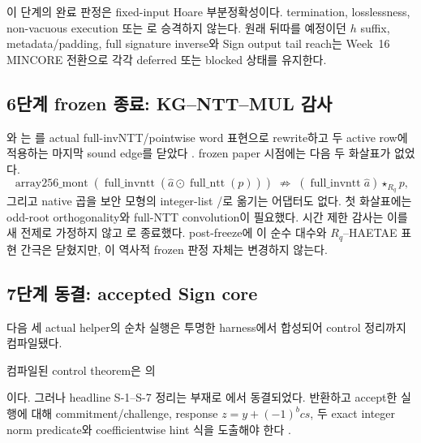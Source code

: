 이 단계의 완료 판정은 fixed-input Hoare 부분정확성이다. termination,
losslessness, non-vacuous execution 또는 로 승격하지 않는다.
원래 뒤따를 예정이던 \(h\) suffix, metadata/padding, full signature inverse와
Sign output tail reach는 Week~16 MINCORE 전환으로 각각 deferred 또는 blocked
상태를 유지한다.

\subsection{6단계 frozen 종료: KG--NTT--MUL 감사}

와
는
를 actual full-invNTT/pointwise
word 표현으로 rewrite하고 두 active row에 적용하는 마지막 sound edge를 닫았다
\cite{week16-kg-ntt-mul-report}. frozen paper 시점에는 다음 두 화살표가 없었다.
\[
  \operatorname{array256\_mont}
    (\operatorname{full\_invntt}(\widehat a\odot\operatorname{full\_ntt}(p)))
  \;\not\Longrightarrow\;
  (\operatorname{full\_invntt}\widehat a)\star_{R_q}p,
\]
그리고 native  곱을 보안 모형의 integer-list
/로 옮기는 어댑터도 없다. 첫
화살표에는 odd-root orthogonality와 full-NTT convolution이 필요했다. 시간 제한
감사는 이를 새 전제로 가정하지 않고 로 종료했다.
post-freeze에 이 순수 대수와 \(R_q\)--HAETAE 표현 간극은 닫혔지만, 이 역사적
frozen 판정 자체는 변경하지 않는다.

\subsection{7단계 동결: accepted Sign core}

다음 세 actual helper의 순차 실행은 투명한 harness에서 합성되어 control
정리까지 컴파일됐다.
\begin{center}
\quad
{}\quad
{}
\end{center}
컴파일된 control theorem은
의
\begin{center}
\end{center}
이다. 그러나 headline S-1--S-7 정리는
 부재로
에서 동결되었다.
반환하고 accept한 실행에 대해 commitment/challenge, response
\(z=y+(-1)^bcs\), 두 exact integer norm predicate와 coefficientwise hint 식을
도출해야 한다 \cite{week16-mincore-plan,claim-ledger}.

